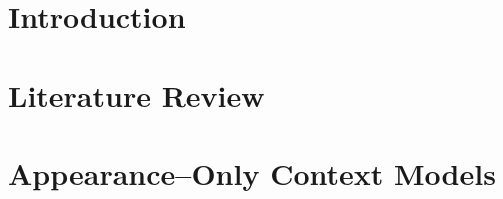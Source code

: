 \documentclass[a4paper,11pt]{report}
\begin{document}
\pagestyle{empty}
\setcounter{page}{1}

\def\localpath{frontmatter}

\sglspace


\setcounter{tocdepth}{2}
\tableofcontents
\newpage

\newpage

%

\newpage
\setcounter{page}{0}
\pagestyle{thesisheadings}

\doublespacing
\parskip 9pt

%
\def\localpath{Introduction}
\graphicspath{{\localpath/figures/}}
\chapter{Introduction}
\label{chap:intro}


%
\def\localpath{Review}
\graphicspath{{\localpath/figures/}}
\chapter{Literature Review}
\label{chap:review}


%
\def\localpath{AppearanceOnly}
\graphicspath{{\localpath/figures/}}
\chapter{Appearance--Only Context Models}
\label{chap:appearance-only}


%
\def\localpath{Geometry}
\graphicspath{{\localpath/figures/}}
\end{document}

